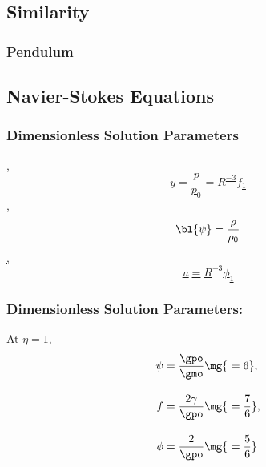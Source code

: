 

\subsection{Similarity}
%
\begin{frame}\frametitle{Pendulum}
\end{frame}
%
\subsection{Navier-Stokes Equations}

\begin{frame}\frametitle{Dimensionless Solution Parameters}
\href{\urlTaylora\#page=2}{
, \\
\begin{equation}
	y = \frac{p}{p_{0}} = R^{-3} f_{1}
\end{equation}
, \\
\begin{equation}
	\bl{\psi} = \frac{\rho}{\rho_{0}}
\end{equation}
, \\
\begin{equation}
	u = R^{-3} \phi_{1}
\end{equation}
}
\end{frame}

\begin{frame}\frametitle{Dimensionless Solution Parameters: }
At $\eta =1$, 
\ \\
\href{\urlTaylora\#page=4}{
\begin{align}
%
	\psi&= \frac{\gpo} {\gmo} \mg{\ =  6}, \\[10pt]
%
	f &= \frac{2 \gamma} {\gpo} \mg{\ = \frac{7}{6}}, \\[10pt]
%
	\phi &= \frac{2} {\gpo} \mg{\  =\frac{5}{6}} 
%
\end{align}}
\end{frame}

